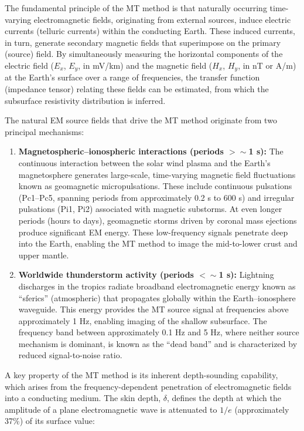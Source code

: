 The fundamental principle of the MT method is that naturally occurring time-varying electromagnetic fields, originating from external sources, induce electric currents (telluric currents) within the conducting Earth. These induced currents, in turn, generate secondary magnetic fields that superimpose on the primary (source) field. By simultaneously measuring the horizontal components of the electric field ($E_x$, $E_y$, in mV/km) and the magnetic field ($H_x$, $H_y$, in nT or A/m) at the Earth's surface over a range of frequencies, the transfer function (impedance tensor) relating these fields can be estimated, from which the subsurface resistivity distribution is inferred.

The natural EM source fields that drive the MT method originate from two principal mechanisms:

\begin{enumerate}
    \item \textbf{Magnetospheric--ionospheric interactions (periods $> \sim$1 s):} The continuous interaction between the solar wind plasma and the Earth's magnetosphere generates large-scale, time-varying magnetic field fluctuations known as geomagnetic micropulsations. These include continuous pulsations (Pc1--Pc5, spanning periods from approximately 0.2 s to 600 s) and irregular pulsations (Pi1, Pi2) associated with magnetic substorms. At even longer periods (hours to days), geomagnetic storms driven by coronal mass ejections produce significant EM energy. These low-frequency signals penetrate deep into the Earth, enabling the MT method to image the mid-to-lower crust and upper mantle.

    \item \textbf{Worldwide thunderstorm activity (periods $< \sim$1 s):} Lightning discharges in the tropics radiate broadband electromagnetic energy known as ``sferics'' (atmospheric) that propagates globally within the Earth--ionosphere waveguide. This energy provides the MT source signal at frequencies above approximately 1 Hz, enabling imaging of the shallow subsurface. The frequency band between approximately 0.1 Hz and 5 Hz, where neither source mechanism is dominant, is known as the ``dead band'' and is characterized by reduced signal-to-noise ratio.
\end{enumerate}

A key property of the MT method is its inherent depth-sounding capability, which arises from the frequency-dependent penetration of electromagnetic fields into a conducting medium. The skin depth, $\delta$, defines the depth at which the amplitude of a plane electromagnetic wave is attenuated to $1/e$ (approximately 37\%) of its surface value:

